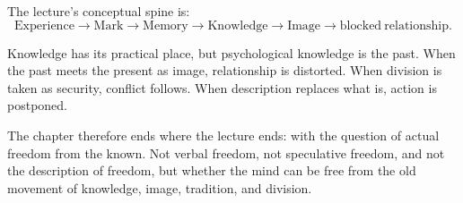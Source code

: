 The lecture's conceptual spine is:
\begin{equation}
\mathrm{Experience}
\longrightarrow
\mathrm{Mark}
\longrightarrow
\mathrm{Memory}
\longrightarrow
\mathrm{Knowledge}
\longrightarrow
\mathrm{Image}
\longrightarrow
\mathrm{blocked\ relationship}.
\end{equation}

Knowledge has its practical place, but psychological knowledge is the past. When the past meets the present as image, relationship is distorted. When division is taken as security, conflict follows. When description replaces what is, action is postponed.

The chapter therefore ends where the lecture ends: with the question of actual freedom from the known. Not verbal freedom, not speculative freedom, and not the description of freedom, but whether the mind can be free from the old movement of knowledge, image, tradition, and division.